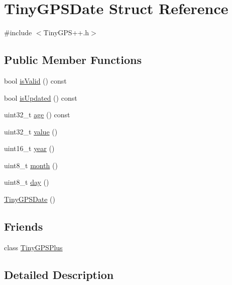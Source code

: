 \hypertarget{struct_tiny_g_p_s_date}{}\section{Tiny\+G\+P\+S\+Date Struct Reference}
\label{struct_tiny_g_p_s_date}


{\ttfamily \#include $<$Tiny\+G\+P\+S++.\+h$>$}

\subsection*{Public Member Functions}
\begin{DoxyCompactItemize}
\item 
bool \hyperlink{struct_tiny_g_p_s_date_a0ef145848ab03e4e9db0e2cf3a4c42cd}{is\+Valid} () const 
\item 
bool \hyperlink{struct_tiny_g_p_s_date_aed8706c1c3e67558fec2b94476c144e0}{is\+Updated} () const 
\item 
uint32\+\_\+t \hyperlink{struct_tiny_g_p_s_date_a7b92ac9058dbde1770eb52ce5da890c1}{age} () const 
\item 
uint32\+\_\+t \hyperlink{struct_tiny_g_p_s_date_a718150ae16f68afa9ae81f9d1b3ce3f4}{value} ()
\item 
uint16\+\_\+t \hyperlink{struct_tiny_g_p_s_date_ae2cc914fec377b429d99f01204f50d60}{year} ()
\item 
uint8\+\_\+t \hyperlink{struct_tiny_g_p_s_date_a6f3c5b4e72ef28b010f94ac9016315f3}{month} ()
\item 
uint8\+\_\+t \hyperlink{struct_tiny_g_p_s_date_ae8cc5f80c49e328f792d168a44062000}{day} ()
\item 
\hyperlink{struct_tiny_g_p_s_date_a4d5f23eb008cbfd385343687bf902003}{Tiny\+G\+P\+S\+Date} ()
\end{DoxyCompactItemize}
\subsection*{Friends}
\begin{DoxyCompactItemize}
\item 
class \hyperlink{struct_tiny_g_p_s_date_a6501fd5ef19ae166d43e0e5781609ee2}{Tiny\+G\+P\+S\+Plus}
\end{DoxyCompactItemize}


\subsection{Detailed Description}


